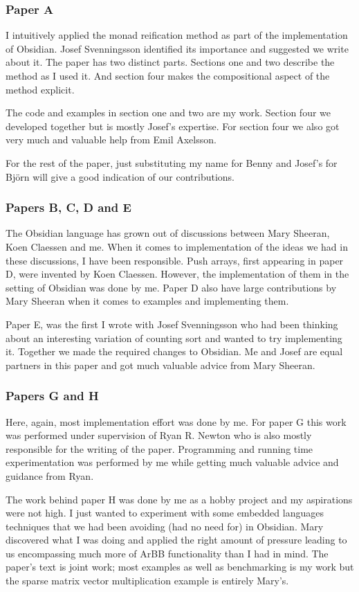 \documentclass[a4paper]{book}
\begin{document}
\subsubsection{Paper A}
I intuitively applied the monad reification method as part of the implementation 
of Obsidian. Josef Svenningsson identified its importance and suggested we write 
about it. The paper has two distinct parts. Sections one and two describe the 
method as I used it. And section four makes the compositional aspect of the method 
explicit. 

The code and examples in section one and two are my work. Section four we developed together 
but is mostly Josef's expertise. For section four we also got very much and valuable help 
from Emil Axelsson. 

For the rest of the paper, just substituting my name for Benny and Josef's for Bj\"orn
will give a good indication of our contributions. 

\subsubsection{Papers B, C, D and E} 
The Obsidian language has grown out of discussions between Mary Sheeran, Koen Claessen and me. 
When it comes to implementation of the ideas we had in these discussions, I have been responsible. 
Push arrays, first appearing in paper D, were invented by Koen Claessen. However, the 
implementation of them in the setting of Obsidian was done by me. Paper D also have large 
contributions by Mary Sheeran when it comes to examples and implementing them. 

Paper E, was the first I wrote with Josef Svenningsson who had been thinking about an interesting
variation of counting sort and wanted to try implementing it. Together we made the required changes
to Obsidian. Me and Josef are equal partners in this paper and got much valuable advice from 
Mary Sheeran. 

\subsubsection{Papers G and H} 
Here, again, most implementation effort was done by me. For paper G this work was performed 
under supervision of Ryan R. Newton who is also mostly responsible for the writing of the 
paper. Programming and running time experimentation was performed by me while getting much 
valuable advice and guidance from Ryan. 

The work behind paper H was done by me as a hobby project and my aspirations were not 
high. I just wanted to experiment with some embedded languages techniques that we had 
been avoiding (had no need for) in Obsidian. Mary discovered what I was doing and applied 
the right amount of pressure leading to us encompassing much more of ArBB functionality than 
I had in mind. The paper's text is joint work; most examples as well as benchmarking is my work
but the sparse matrix vector multiplication example is entirely Mary's. 
\end{document}
